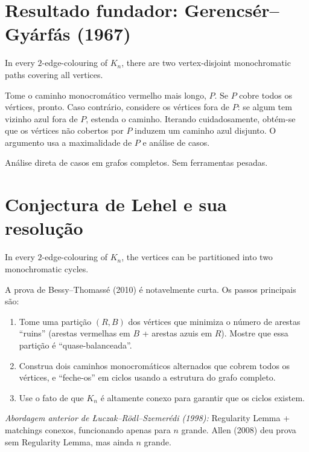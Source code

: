\documentclass[12pt,a4paper,twoside,openright]{book}
\theoremstyle{definition}
\begin{document}
\section{Resultado fundador: Gerencsér--Gyárfás (1967)}

\begin{theorem}
In every $2$-edge-colouring of $K_n$, there are two vertex-disjoint monochromatic paths covering all vertices.
\end{theorem}

\begin{proofsketch}
Tome o caminho monocromático vermelho mais longo, $P$. Se $P$ cobre todos os vértices, pronto.
Caso contrário, considere os vértices fora de $P$: se algum tem vizinho azul fora de $P$,
estenda o caminho. Iterando cuidadosamente, obtém-se que os vértices não cobertos por $P$
induzem um caminho azul disjunto. O argumento usa a maximalidade de $P$ e análise de casos.
\end{proofsketch}

\begin{techniques}
Análise direta de casos em grafos completos. Sem ferramentas pesadas.
\end{techniques}

\section{Conjectura de Lehel e sua resolução}

\begin{theorem}
In every $2$-edge-colouring of $K_n$, the vertices can be partitioned into two monochromatic cycles.
\end{theorem}

\begin{proofsketch}
A prova de Bessy--Thomassé (2010) é notavelmente curta. Os passos principais são:
\begin{enumerate}[leftmargin=*]
  \item Tome uma partição $(R, B)$ dos vértices que minimiza o número de arestas ``ruins''
        (arestas vermelhas em $B$ + arestas azuis em $R$). Mostre que essa partição é ``quase-balanceada''.
  \item Construa dois caminhos monocromáticos alternados que cobrem todos os vértices,
        e ``feche-os'' em ciclos usando a estrutura do grafo completo.
  \item Use o fato de que $K_n$ é altamente conexo para garantir que os ciclos existem.
\end{enumerate}

\medskip
\textit{Abordagem anterior de Łuczak--Rödl--Szemerédi (1998):} Regularity Lemma + matchings conexos,
funcionando apenas para $n$ grande. Allen (2008) deu prova sem Regularity Lemma, mas ainda $n$ grande.
\end{proofsketch}
\end{document}
